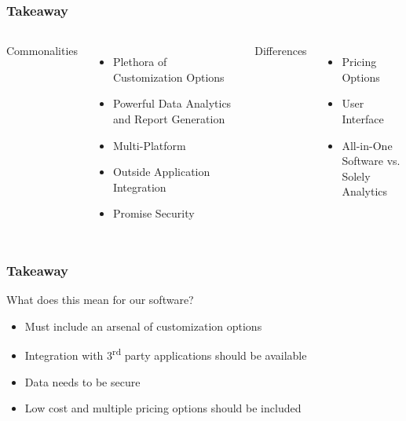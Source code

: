 \documentclass{beamer}
\begin{document}
	\begin{frame}
		\frametitle{Takeaway}
		\begin{columns}[t]
				Commonalities
				\begin{itemize}
					\item Plethora of Customization Options
					\item Powerful Data Analytics and Report Generation
					\item Multi-Platform
					\item Outside Application Integration
					\item Promise Security
				\end{itemize}
				\pause
				Differences
				\begin{itemize}
					\item Pricing Options
					\item User Interface
					\item All-in-One Software vs.\\ Solely Analytics
				\end{itemize}
		\end{columns}
	\end{frame}
	
	\begin{frame}
		\frametitle{Takeaway}
		 What does this mean for our software?
		 \begin{itemize}
		 	\item<1->\alert{Must} include an arsenal of customization options
		 	\item<2->Integration with 3\textsuperscript{rd} party applications should be available
		 	\item<3->Data needs to be secure
		 	\item<4->Low cost and multiple pricing options should be included
		 \end{itemize}
	\end{frame}
\end{document}
